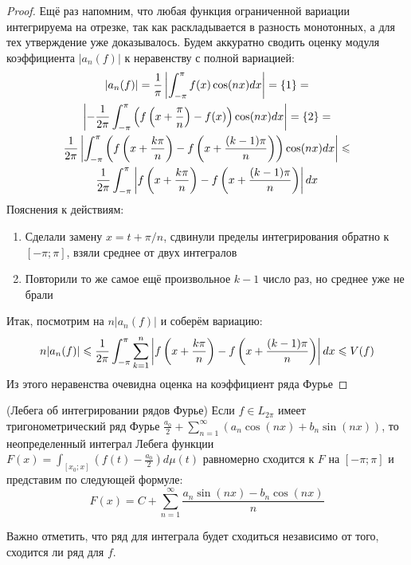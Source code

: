 \begin{proof}
	Ещё раз напомним, что любая функция ограниченной вариации интегрируема на отрезке, так как раскладывается в разность монотонных, а для тех утверждение уже доказывалось. Будем аккуратно сводить оценку модуля коэффициента $|a_n(f)|$ к неравенству с полной вариацией:
	\begin{multline*}
		|a_n(f)| = \frac{1}{\pi}\left|\int_{-\pi}^\pi f(x)\cos(nx)dx\right| = \{1\} =
		\\
		\left|-\frac{1}{2\pi} \int_{-\pi}^\pi \left(f\left(x + \frac{\pi}{n}\right) - f(x)\right)\cos(nx)dx\right| = \{2\} =
		\\
		\frac{1}{2\pi} \left|\int_{-\pi}^\pi \left(f\left(x + \frac{k\pi}{n}\right) - f\left(x + \frac{(k - 1)\pi}{n}\right)\right)\cos(nx)dx\right| \leqslant
		\\
		\frac{1}{2\pi} \int_{-\pi}^\pi \left|f\left(x + \frac{k\pi}{n}\right) - f\left(x + \frac{(k - 1)\pi}{n}\right)\right|dx
	\end{multline*}
	Пояснения к действиям:
	\begin{enumerate}
		\item Сделали замену $x = t + \pi / n$, сдвинули пределы интегрирования обратно к $[-\pi; \pi]$, взяли среднее от двух интегралов
		
		\item Повторили то же самое ещё произвольное $k - 1$ число раз, но среднее уже не брали
	\end{enumerate}
	Итак, посмотрим на $n|a_n(f)|$ и соберём вариацию:
	\[
		n|a_n(f)| \leqslant \frac{1}{2\pi} \int_{-\pi}^\pi \sum_{k = 1}^n \left|f\left(x + \frac{k\pi}{n}\right) - f\left(x + \frac{(k - 1)\pi}{n}\right)\right|dx \leqslant V(f)
	\]
	Из этого неравенства очевидна оценка на коэффициент ряда Фурье
\end{proof}

\begin{theorem} (Лебега об интегрировании рядов Фурье)
	Если $f \in L_{2\pi}$ имеет тригонометрический ряд Фурье $\frac{a_0}{2} + \sum_{n = 1}^\infty (a_n\cos(nx) + b_n\sin(nx))$, то неопределенный интеграл Лебега функции $F(x) = \int_{[x_0; x]} (f(t) - \frac{a_0}{2})d\mu(t)$ равномерно сходится к $F$ на $[-\pi; \pi]$ и представим по следующей формуле:
	\[
		F(x) = C + \sum_{n = 1}^\infty \frac{a_n\sin(nx) - b_n\cos(nx)}{n}
	\]
\end{theorem}

\begin{note}
	Важно отметить, что ряд для интеграла будет сходиться независимо от того, сходится ли ряд для $f$.
\end{note}

